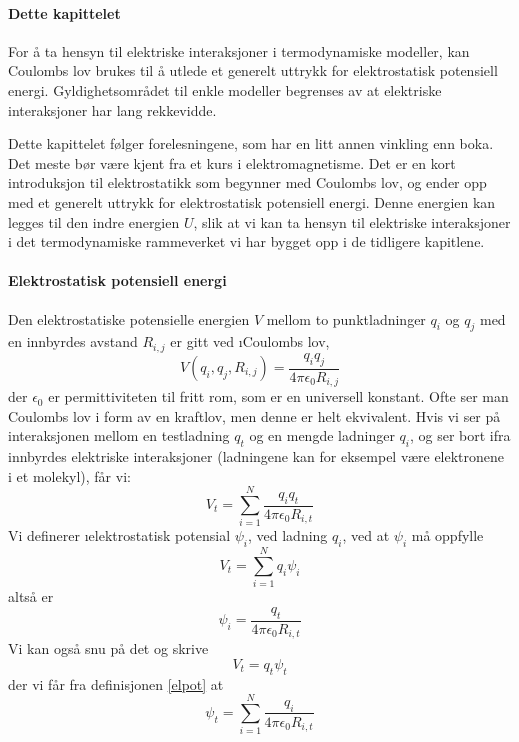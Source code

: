 \paragraph{Dette kapittelet}
For å ta hensyn til elektriske interaksjoner i termodynamiske modeller, kan Coulombs lov brukes til å utlede et generelt uttrykk for elektrostatisk potensiell energi. Gyldighetsområdet til enkle modeller begrenses av at elektriske interaksjoner har lang rekkevidde.

Dette kapittelet følger forelesningene, som har en litt annen vinkling enn boka. Det meste bør være kjent fra et kurs i elektromagnetisme. Det er en kort introduksjon til elektrostatikk som begynner med Coulombs lov, og ender opp med et generelt uttrykk for elektrostatisk potensiell energi. Denne energien kan legges til den indre energien $U$, slik at vi kan ta hensyn til elektriske interaksjoner i det termodynamiske rammeverket vi har bygget opp i de tidligere kapitlene. 

\paragraph{Elektrostatisk potensiell energi} 
Den elektrostatiske potensielle energien $V$ mellom to punktladninger $q_i$ og $q_j$ med en innbyrdes avstand $R_{i,j}$ er gitt ved \i{Coulombs lov},
\begin{equation}
	V(q_i,q_j,R_{i,j}) = \frac{q_iq_j}{4\pi\epsilon_0R_{i,j}}
\end{equation}
der $\epsilon_0$ er permittiviteten til fritt rom, som er en universell konstant. Ofte ser man Coulombs lov i form av en kraftlov, men denne er helt ekvivalent. Hvis vi ser på interaksjonen mellom en testladning $q_t$ og en mengde ladninger $q_i$, og ser bort ifra innbyrdes elektriske interaksjoner (ladningene kan for eksempel være elektronene i et molekyl), får vi:
\begin{equation}
	V_t=\sum_{i=1}^N\frac{q_iq_t}{4\pi\epsilon_0R_{i,t}}
\end{equation}
Vi definerer \i{elektrostatisk potensial} $\psi_i$, ved ladning $q_i$, ved at $\psi_i$ må oppfylle
\begin{equation}
	\label{elpot}
	V_t=\sum_{i=1}^Nq_i\psi_i
\end{equation}
altså er
\begin{equation}
	\psi_i=\frac{q_t}{4\pi\epsilon_0R_{i,t}}
\end{equation}
Vi kan også snu på det og skrive
\begin{equation}
	V_t=q_t\psi_t
\end{equation}
der vi får fra definisjonen \eqref{elpot} at
\begin{equation}
	\psi_t=\sum_{i=1}^N\frac{q_i}{4\pi\epsilon_0R_{i,t}}
\end{equation}
